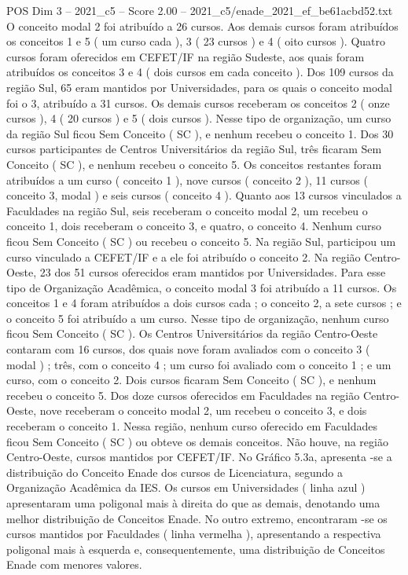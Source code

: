 \begin{textsample}{POS Dim 3 – 2021\_c5 – Score 2.00 – 2021\_c5/enade\_2021\_ef\_be61acbd52.txt}
O conceito modal 2 foi atribuído a 26 cursos.
Aos demais cursos foram atribuídos os conceitos 1 e 5 ( um curso cada ), 3 ( 23 cursos ) e 4 ( oito cursos ).
Quatro cursos foram oferecidos em CEFET/IF na região Sudeste, aos quais foram atribuídos os conceitos 3 e 4 ( dois cursos em cada conceito ).
Dos 109 cursos da região Sul, 65 eram mantidos por Universidades, para os quais o conceito modal foi o 3, atribuído a 31 cursos.
Os demais cursos receberam os conceitos 2 ( onze cursos ), 4 ( 20 cursos ) e 5 ( dois cursos ).
Nesse tipo de organização, um curso da região Sul ficou Sem Conceito ( SC ), e nenhum recebeu o conceito 1.
Dos 30 cursos participantes de Centros Universitários da região Sul, três ficaram Sem Conceito ( SC ), e nenhum recebeu o conceito 5.
Os conceitos restantes foram atribuídos a um curso ( conceito 1 ), nove cursos ( conceito 2 ), 11 cursos ( conceito 3, modal ) e seis cursos ( conceito 4 ).
Quanto aos 13 cursos vinculados a Faculdades na região Sul, seis receberam o conceito modal 2, um recebeu o conceito 1, dois receberam o conceito 3, e quatro, o conceito 4.
Nenhum curso ficou Sem Conceito ( SC ) ou recebeu o conceito 5.
Na região Sul, participou um curso vinculado a CEFET/IF e a ele foi atribuído o conceito 2.
Na região Centro-Oeste, 23 dos 51 cursos oferecidos eram mantidos por Universidades.
Para esse tipo de Organização Acadêmica, o conceito modal 3 foi atribuído a 11 cursos.
Os conceitos 1 e 4 foram atribuídos a dois cursos cada ; o conceito 2, a sete cursos ; e o conceito 5 foi atribuído a um curso.
Nesse tipo de organização, nenhum curso ficou Sem Conceito ( SC ).
Os Centros Universitários da região Centro-Oeste contaram com 16 cursos, dos quais nove foram avaliados com o conceito 3 ( modal ) ; três, com o conceito 4 ; um curso foi avaliado com o conceito 1 ; e um curso, com o conceito 2.
Dois cursos ficaram Sem Conceito ( SC ), e nenhum recebeu o conceito 5.
Dos doze cursos oferecidos em Faculdades na região Centro-Oeste, nove receberam o conceito modal 2, um recebeu o conceito 3, e dois receberam o conceito 1.
Nessa região, nenhum curso oferecido em Faculdades ficou Sem Conceito ( SC ) ou obteve os demais conceitos.
Não houve, na região Centro-Oeste, cursos mantidos por CEFET/IF.
No Gráfico 5.3a, apresenta -se a distribuição do Conceito Enade dos cursos de Licenciatura, segundo a Organização Acadêmica da IES.
Os cursos em Universidades ( linha azul ) apresentaram uma poligonal mais à direita do que as demais, denotando uma melhor distribuição de Conceitos Enade.
No outro extremo, encontraram -se os cursos mantidos por Faculdades ( linha vermelha ), apresentando a respectiva poligonal mais à esquerda e, consequentemente, uma distribuição de Conceitos Enade com menores valores.

\end{textsample}
